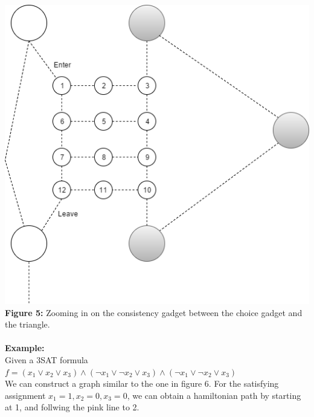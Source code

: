 \documentclass{article}
\begin{document}
\includegraphics[scale=0.5]{HAMConsistency}\\
\textbf{Figure 5:} Zooming in on the consistency gadget between the choice gadget and the triangle.\\\\
\textbf{Example:}\\
Given a 3SAT formula  $f = (x_1 \lor x_2 \lor x_3) \land (\lnot x_1 \lor \lnot x_2 \lor x_3) \land (\lnot x_1 \lor \lnot x_2 \lor x_3)$\\
We can construct a graph similar to the one in figure 6. For the satisfying assignment $x_1 = 1, x_2 = 0, x_3 = 0$, we can obtain a hamiltonian path by starting at 1, and follwing the pink line to 2.
\end{document}
